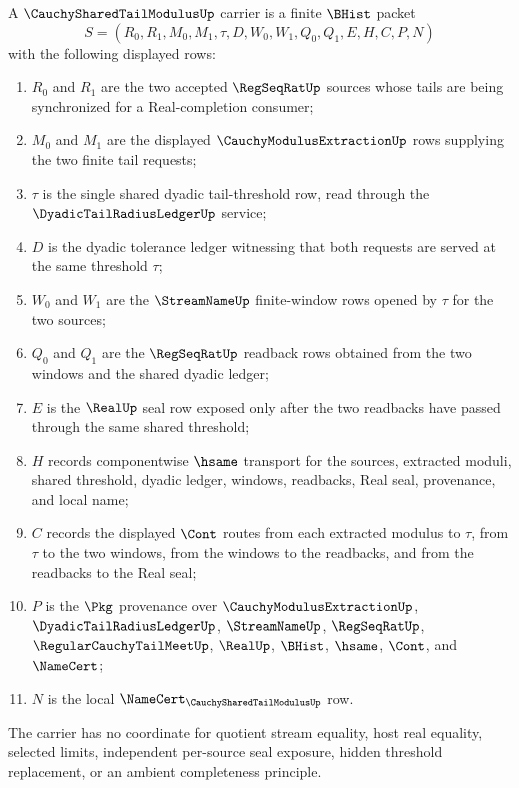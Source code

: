 \begin{definition}
\label{def:cauchy-shared-tail-modulus-carrier}
A $\CauchySharedTailModulusUp$ carrier is a finite $\BHist$ packet
$$
S=(R_0,R_1,M_0,M_1,\tau,D,W_0,W_1,Q_0,Q_1,E,H,C,P,N)
$$
with the following displayed rows:
\begin{enumerate}
\item $R_0$ and $R_1$ are the two accepted $\RegSeqRatUp$ sources whose tails are being synchronized for a Real-completion consumer;
\item $M_0$ and $M_1$ are the displayed $\CauchyModulusExtractionUp$ rows supplying the two finite tail requests;
\item $\tau$ is the single shared dyadic tail-threshold row, read through the $\DyadicTailRadiusLedgerUp$ service;
\item $D$ is the dyadic tolerance ledger witnessing that both requests are served at the same threshold $\tau$;
\item $W_0$ and $W_1$ are the $\StreamNameUp$ finite-window rows opened by $\tau$ for the two sources;
\item $Q_0$ and $Q_1$ are the $\RegSeqRatUp$ readback rows obtained from the two windows and the shared dyadic ledger;
\item $E$ is the $\RealUp$ seal row exposed only after the two readbacks have passed through the same shared threshold;
\item $H$ records componentwise $\hsame$ transport for the sources, extracted moduli, shared threshold, dyadic ledger, windows, readbacks, Real seal, provenance, and local name;
\item $C$ records the displayed $\Cont$ routes from each extracted modulus to $\tau$, from $\tau$ to the two windows, from the windows to the readbacks, and from the readbacks to the Real seal;
\item $P$ is the $\Pkg$ provenance over $\CauchyModulusExtractionUp$, $\DyadicTailRadiusLedgerUp$, $\StreamNameUp$, $\RegSeqRatUp$, $\RegularCauchyTailMeetUp$, $\RealUp$, $\BHist$, $\hsame$, $\Cont$, and $\NameCert$;
\item $N$ is the local $\NameCert_{\CauchySharedTailModulusUp}$ row.
\end{enumerate}
The carrier has no coordinate for quotient stream equality, host real equality, selected limits, independent per-source seal exposure, hidden threshold replacement, or an ambient completeness principle.
\end{definition}


